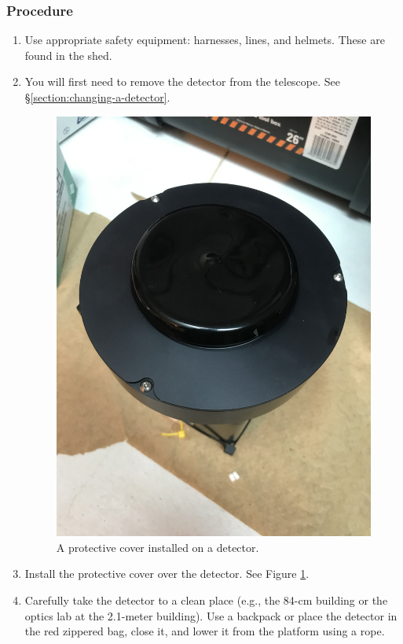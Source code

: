 \subsubsection{Procedure}

\begin{enumerate}
\item
Use appropriate safety equipment: harnesses, lines, and helmets. These are found in the shed.

\item You will first need to remove the detector from the telescope. See \S\ref{section:changing-a-detector}.

\begin{figure}
\begin{center}
\includegraphics[width=0.8\linewidth]{figures/instrument-ddoti-detector-cover}
\end{center}
\caption{A protective cover installed on a detector.}
\label{figure:instrument-ddoti-detector-cover}
\end{figure}

\item Install the protective cover over the detector. See Figure \ref{figure:instrument-ddoti-detector-cover}.

\item Carefully take the detector to a clean place (e.g., the 84-cm building or the optics lab at the 2.1-meter building). Use a backpack or place the detector in the red zippered bag, close it, and lower it from the platform using a rope.


\end{enumerate}
